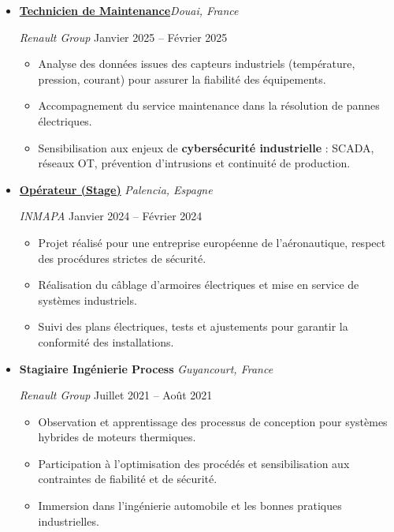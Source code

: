 \documentclass[a4paper,10pt]{article}
\begin{document}
\begin{itemize}[leftmargin=*]

  \item
  \textbf{\href{https://www.renaultgroup.com/}{Technicien de Maintenance}}\hfill \emph{Douai, France} \
  
  \emph{Renault Group} \hfill Janvier 2025 – Février 2025 \
  \begin{itemize}
    \item Analyse des données issues des capteurs industriels (température, pression, courant) pour assurer la fiabilité des équipements.  
    \item Accompagnement du service maintenance dans la résolution de pannes électriques.    
    \item Sensibilisation aux enjeux de \textbf{cybersécurité industrielle} : SCADA, réseaux OT, prévention d’intrusions et continuité de production.  
  \end{itemize}

  \item
  \textbf{\href{https://www.inmapa.com/en/}{Opérateur (Stage)}} \hfill \emph{Palencia, Espagne} \
  
  \emph{INMAPA} \hfill Janvier 2024 – Février 2024 \
  \begin{itemize}
    \item Projet réalisé pour une entreprise européenne de l’aéronautique, respect des procédures strictes de sécurité. 
    \item Réalisation du câblage d’armoires électriques et mise en service de systèmes industriels.  
    \item Suivi des plans électriques, tests et ajustements pour garantir la conformité des installations.  
 
  \end{itemize}

  \item
  \textbf{Stagiaire Ingénierie Process} \hfill \emph{Guyancourt, France} \

  \emph{Renault Group} \hfill Juillet 2021 – Août 2021 \
  \begin{itemize}
    \item Observation et apprentissage des processus de conception pour systèmes hybrides de moteurs thermiques.  
    \item Participation à l’optimisation des procédés et sensibilisation aux contraintes de fiabilité et de sécurité.  
    \item Immersion dans l’ingénierie automobile et les bonnes pratiques industrielles.  
  \end{itemize}

\end{itemize}
\end{document}
